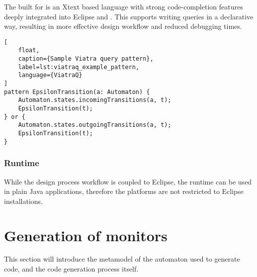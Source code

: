 The \dsl{} built for \viatraq{} is an Xtext based language with strong code-completion features deeply integrated into Eclipse and \emf{}. This \dsl{} supports writing queries in a declarative way, resulting in more effective design workflow and reduced debugging times.

\begin{lstlisting}[
	float,
	caption={Sample Viatra query pattern},
	label=lst:viatraq_example_pattern,
	language={ViatraQ}
]
pattern EpsilonTransition(a: Automaton) {
	Automaton.states.incomingTransitions(a, t);
	EpsilonTransition(t);
} or {
	Automaton.states.outgoingTransitions(a, t);
	EpsilonTransition(t);
}
\end{lstlisting}

\subsubsection{Runtime}

While the design process workflow is coupled to Eclipse, the \viatraq{} runtime can be used in plain Java applications, therefore the platforms are not restricted to Eclipse installations.

\section{Generation of monitors}

This section will introduce the metamodel of the automaton used to generate code, and the code generation process itself.
